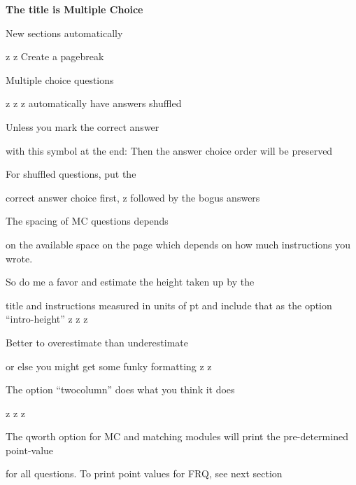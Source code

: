 \documentclass{exam}
\begin{document}
\newpage
\par\noindent \textbf{\large  The title is Multiple Choice}
\setlength{\columnsep}{0.40 in}
\begin{multicols*}{2}
\renewcommand{\choiceshook}{\setlength{\leftmargin}{0.40 in}}
\renewcommand{\questionshook}{\setlength{\leftmargin}{0.0 in}}
\begin{questions}
\setcounter{question}{19}
	\question[2] New sections automatically
	\begin{choices}
		\choice z
		\choice z
		\CorrectChoice Create a pagebreak
	\end{choices}
	\question[2] Multiple choice questions
	\begin{choices}
		\choice z
		\choice z
		\choice z
		\CorrectChoice automatically have answers shuffled
	\end{choices}
	\question[2] Unless you mark the correct answer
	\begin{choices}
		\CorrectChoice with this symbol at the end:
		\choice Then the answer choice order
		\choice will be
		\choice preserved
	\end{choices}
	\question[2] For shuffled questions, put the
	\begin{choices}
		\CorrectChoice correct answer choice first,
		\choice z
		\choice followed by the bogus answers
	\end{choices}
	\question[2] The spacing of MC questions depends
	\begin{choices}
		\choice on the available space on the page
		\CorrectChoice which depends on how much instructions you wrote.
	\end{choices}
	\question[2] So do me a favor and estimate the height taken up by the
	\begin{choices}
		\choice title and instructions
		\CorrectChoice measured in units of pt
		\choice and include that as the option ``intro-height''
		\choice z
		\choice z
		\choice z
	\end{choices}
	\question[2] Better to overestimate than underestimate
	\begin{choices}
		\CorrectChoice or else you might get some funky formatting
		\choice z
		\choice z
	\end{choices}
	\vfill\null\columnbreak
	\question[2] The option ``twocolumn'' does what you think it does
	\begin{choices}
		\CorrectChoice z
		\CorrectChoice z
		\CorrectChoice z
	\end{choices}
	\question[2] The qworth option for MC and matching modules will print the pre-determined point-value
	\begin{choices}
		\CorrectChoice for all questions.
		\choice To print point values for FRQ, see next section
	\end{choices}
\end{questions}
\end{multicols*}
\renewcommand{\choiceshook}{}
\renewcommand{\questionshook}{}
\end{document}
